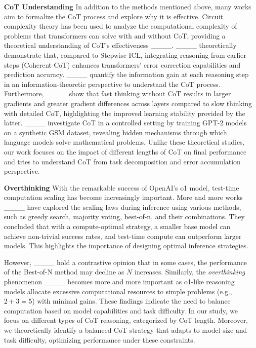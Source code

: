 \textbf{CoT Understanding}
In addition to the methods mentioned above, many works aim to formalize the CoT process and explore why it is effective. Circuit complexity theory has been used to analyze the computational complexity of problems that transformers can solve with and without CoT, providing a theoretical understanding of CoT's effectiveness ____. ____ theoretically demonstrate that, compared to Stepwise ICL, integrating reasoning from earlier steps (Coherent CoT) enhances transformers' error correction capabilities and prediction accuracy. ____ quantify the information gain at each reasoning step in an information-theoretic perspective to understand the CoT process. Furthermore, ____ show that fast thinking without CoT results in larger gradients and greater gradient differences across layers compared to slow thinking with detailed CoT, highlighting the improved learning stability provided by the latter. ____ investigate CoT in a controlled setting by training GPT-2 models on a synthetic GSM dataset, revealing hidden mechanisms through which language models solve mathematical problems. Unlike these theoretical studies, our work focuses on the impact of different lengths of CoT on final performance and tries to understand CoT from task decomposition and error accumulation perspective. 

\textbf{Overthinking}
With the remarkable success of OpenAI's o1 model, test-time computation scaling has become increasingly important. More and more works ____ have explored the scaling laws during inference using various methods, such as greedy search, majority voting, best-of-n, and their combinations. They concluded that with a compute-optimal strategy, a smaller base model can achieve non-trivial success rates, and test-time compute can outperform larger models. This highlights the importance of designing optimal inference strategies. 

However, ____ hold a contrastive opinion that in some cases, the performance of the Best-of-N method may decline as \( N \) increases. Similarly, the \textit{overthinking} phenomenon ____ becomes more and more important as o1-like reasoning models allocate excessive computational resources to simple problems (e.g., \( 2+3=5 \)) with minimal gains. These findings indicate the need to balance computation based on model capabilities and task difficulty. In our study, we focus on different types of CoT reasoning, categorized by CoT length. Moreover, we theoretically identify a balanced CoT strategy that adapts to model size and task difficulty, optimizing performance under these constraints.